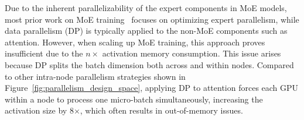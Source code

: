 Due to the inherent parallelizability of the expert components in MoE models, most prior work on MoE training~\cite{rajbhandari2022deepspeed, li2023accelerating} focuses on optimizing expert parallelism, while data parallelism (DP) is typically applied to the non-MoE components such as attention. However, when scaling up MoE training, this approach proves insufficient due to the $n \times$ activation memory consumption. This issue arises because DP splits the batch dimension both across and within nodes. Compared to other intra-node parallelism strategies shown in Figure~\ref{fig:parallelism_design_space}, applying DP to attention forces each GPU within a node to process one micro-batch simultaneously, increasing the activation size by 8$\times$, which often results in out-of-memory issues.




